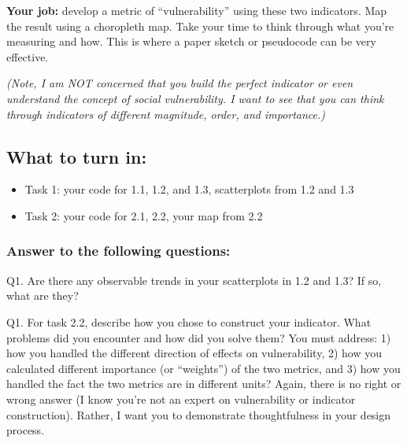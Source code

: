 \documentclass[]{article}
\begin{document}
\textbf{Your job:} develop a metric of ``vulnerability'' using these two
indicators. Map the result using a choropleth map. Take your time to
think through what you're measuring and how. This is where a paper
sketch or pseudocode can be very effective.

\emph{(Note, I am NOT concerned that you build the perfect indicator or
even understand the concept of social vulnerability. I want to see that
you can think through indicators of different magnitude, order, and
importance.)}

\newpage

\hypertarget{what-to-turn-in}{%
\subsection{What to turn in:}\label{what-to-turn-in}}

\begin{itemize}
\item
  Task 1: your code for 1.1, 1.2, and 1.3, scatterplots from 1.2 and 1.3
\item
  Task 2: your code for 2.1, 2.2, your map from 2.2
\end{itemize}

\hypertarget{answer-to-the-following-questions}{%
\subsubsection{Answer to the following
questions:}\label{answer-to-the-following-questions}}

Q1. Are there any observable trends in your scatterplots in 1.2 and 1.3?
If so, what are they?

Q1. For task 2.2, describe how you chose to construct your indicator.
What problems did you encounter and how did you solve them? You must
address: 1) how you handled the different direction of effects on
vulnerability, 2) how you calculated different importance (or
``weights'') of the two metrics, and 3) how you handled the fact the two
metrics are in different units? Again, there is no right or wrong answer
(I know you're not an expert on vulnerability or indicator
construction). Rather, I want you to demonstrate thoughtfulness in your
design process.
\end{document}
